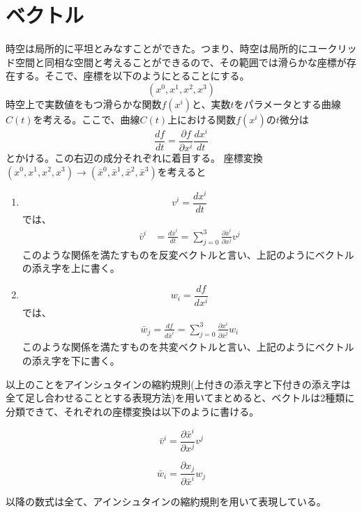 \documentclass[dvipdfmx]{report} %
\begin{document}
\section{ベクトル}
時空は局所的に平坦とみなすことができた。つまり、時空は局所的にユークリッド空間と同相な空間と考えることができるので、その範囲では滑らかな座標が存在する。そこで、座標を以下のようにとることにする。
\[ (x^0, x^1, x^2, x^3) \]
時空上で実数値をもつ滑らかな関数$f(x^i)$と、実数$t$をパラメータとする曲線$C(t)$を考える。ここで、曲線$C(t)$上における関数$f(x^i)$の$t$微分は
\[ \frac{df}{dt} = \frac{\partial f}{\partial x^i} \frac{dx^i}{dt} \]
とかける。この右辺の成分それぞれに着目する。
座標変換$(x^0, x^1, x^2, x^3) \rightarrow (\bar{x}^0, \bar{x}^1, \bar{x}^2, \bar{x}^3)$を考えると
\begin{enumerate}[(1)\,]
\item{}
\[ v^i = \frac{dx^i}{dt} \]
では、
\begin{equation*}
\begin{split}
	\bar{v}^i &= \frac{d\bar{x}^i}{dt} = \sum_{j=0}^{3}\frac{\partial \bar{x}^i}{\partial x^j} v^j
\end{split}
\end{equation*}
このような関係を満たすものを反変ベクトルと言い、上記のようにベクトルの添え字を上に書く。
\item{}
\[ w_i = \frac{df}{dx^i} \]
では、
\begin{equation*}
\begin{split}
	\bar{w}_j = \frac{df}{d\bar{x}^i}  = \sum_{j=0}^{3}\frac{\partial x^i}{\partial \bar{x}^j} w_i
\end{split}
\end{equation*}
このような関係を満たすものを共変ベクトルと言い、上記のようにベクトルの添え字を下に書く。
\end{enumerate}
以上のことをアインシュタインの縮約規則(上付きの添え字と下付きの添え字は全て足し合わせることとする表現方法)を用いてまとめると、ベクトルは2種類に分類できて、それぞれの座標変換は以下のように書ける。
\begin{tcolorbox}[title=反変ベクトルの変換則]
	\[ \bar{v}^i = \frac{\partial \bar{x}^i}{\partial x^j} v^j \]
\end{tcolorbox}
\begin{tcolorbox}[title=共変ベクトルの変換則]
	\[ \bar{w}_i = \frac{\partial x_j}{\partial \bar{x}^i} w_j \]
\end{tcolorbox}
以降の数式は全て、アインシュタインの縮約規則を用いて表現している。

\end{document}
